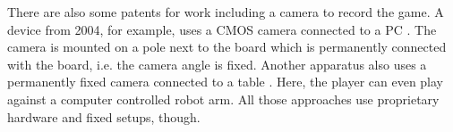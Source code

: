 	There are also some patents for work including a camera to record the game. A device from 2004, for example, uses a CMOS camera connected to a PC \cite{JP2004160170}. The camera is mounted on a pole next to the board which is permanently connected with the board, i.e. the camera angle is fixed. Another apparatus also uses a permanently fixed camera connected to a table \cite{JPH04307077A}. Here, the player can even play against a computer controlled robot arm. All those approaches use proprietary hardware and fixed setups, though.
